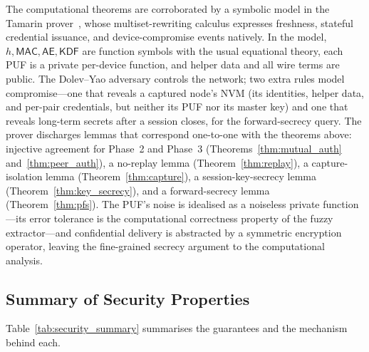 \documentclass[11pt,a4paper]{article}
\begin{document}
The computational theorems are corroborated by a symbolic model in the Tamarin
prover~\cite{tamarin}, whose multiset-rewriting calculus expresses freshness,
stateful credential issuance, and device-compromise events natively. In the
model, $h,\mathsf{MAC},\mathsf{AE},\mathsf{KDF}$ are function symbols with the
usual equational theory, each PUF is a private per-device function, and helper
data and all wire terms are public. The Dolev--Yao adversary controls the
network; two extra rules model compromise---one that reveals a captured node's
NVM (its identities, helper data, and per-pair credentials, but neither its PUF
nor its master key) and one that reveals long-term secrets after a session
closes, for the forward-secrecy query. The prover discharges lemmas that
correspond one-to-one with the theorems above: injective agreement for Phase~2
and Phase~3 (Theorems~\ref{thm:mutual_auth} and~\ref{thm:peer_auth}), a
no-replay lemma (Theorem~\ref{thm:replay}), a capture-isolation lemma
(Theorem~\ref{thm:capture}), a session-key-secrecy lemma
(Theorem~\ref{thm:key_secrecy}), and a forward-secrecy lemma
(Theorem~\ref{thm:pfs}). The PUF's noise is idealised as a noiseless private
function---its error tolerance is the computational correctness property of the
fuzzy extractor---and confidential delivery is abstracted by a symmetric
encryption operator, leaving the fine-grained secrecy argument to the
computational analysis.

\subsection{Summary of Security Properties}

Table~\ref{tab:security_summary} summarises the guarantees and the mechanism
behind each.
\end{document}
